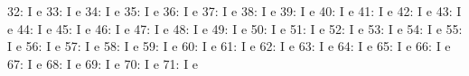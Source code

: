 \documentclass[nojss]{jss}
\begin{document}
\begin{Schunk}
\begin{Soutput}
 32:                                   I                        e
 33:                                   I                        e
 34:                                   I                        e
 35:                                   I                        e
 36:                                   I                        e
 37:                                   I                        e
 38:                                   I                        e
 39:                                   I                        e
 40:                                   I                        e
 41:                                   I                        e
 42:                                   I                        e
 43:                                   I                        e
 44:                                   I                        e
 45:                                   I                        e
 46:                                   I                        e
 47:                                   I                        e
 48:                                   I                        e
 49:                                   I                        e
 50:                                   I                        e
 51:                                   I                        e
 52:                                   I                        e
 53:                                   I                        e
 54:                                   I                        e
 55:                                   I                        e
 56:                                   I                        e
 57:                                   I                        e
 58:                                   I                        e
 59:                                   I                        e
 60:                                   I                        e
 61:                                   I                        e
 62:                                   I                        e
 63:                                   I                        e
 64:                                   I                        e
 65:                                   I                        e
 66:                                   I                        e
 67:                                   I                        e
 68:                                   I                        e
 69:                                   I                        e
 70:                                   I                        e
 71:                                   I                        e

\end{Soutput}
\end{Schunk}
\end{document}
